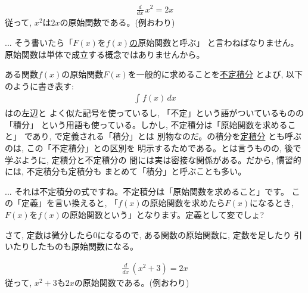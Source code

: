 \begin{exmpl}\label{exmpl:futeisekibun_2x_xx}
\begin{eqnarray}\frac{d}{dx}\,x^2=2x\end{eqnarray}
従って, $x^2$は$2x$の原始関数である。(例おわり)\end{exmpl}

\begin{freqmiss}{\small{}}\end{freqmiss}

\begin{freqmiss}{\small{}... そう書いたら「$F(x)$を\underline{$f(x)$の}原始関数と呼ぶ」
と言わねばなりません。原始関数は単体で成立する概念ではありませんから。}\end{freqmiss}

ある関数$f(x)$の原始関数$F(x)$を一般的に求めることを\underline{不定積分}
とよび, 以下のように書き表す:
\begin{eqnarray}
\int_{}^{} f(x)\, dx\label{eq:def_futeisekibun0}
\end{eqnarray}
はの左辺と
よく似た記号を使っているし, 「不定」という語がついているものの「積分」
という用語も使っている。しかし, 不定積分は「原始関数を求めること」
であり, で定義される「積分」とは
別物なのだ。の積分を\underline{定積分}
とも呼ぶのは, この「不定積分」との区別を
明示するためである。とは言うものの, 後で学ぶように, 定積分と不定積分の
間には実は密接な関係がある。だから, 慣習的には, 不定積分も定積分も
まとめて「積分」と呼ぶことも多い。\hv

\begin{freqmiss}{\small{}
... それは不定積分の式ですね。不定積分は「原始関数を求めること」です。
この「定義」を言い換えると, 「$f(x)$の原始関数を求めたら$F(x)$になるとき, 
$F(x)$を$f(x)$の原始関数という」となります。定義として変でしょ?}\end{freqmiss}

さて, 定数は微分したら0になるので, ある関数の原始関数に, 定数を足したり
引いたりしたものも原始関数になる。

\begin{exmpl}\label{exmpl:futeisekibun_2x_xx_2}
\begin{eqnarray}\frac{d}{dx}\,(x^2+3)=2x\end{eqnarray}
従って, $x^2+3$も$2x$の原始関数である。(例おわり)\end{exmpl}

